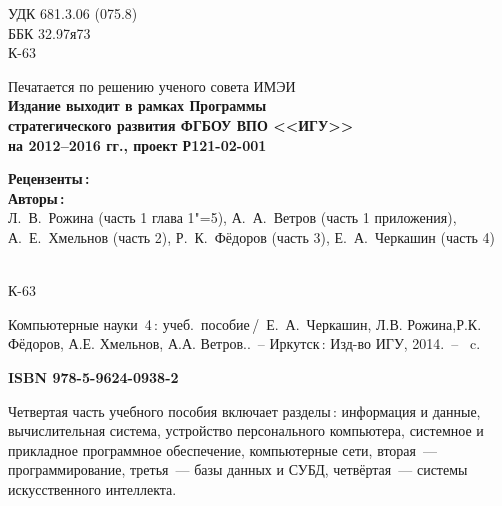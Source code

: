 \documentclass[a4paper,14pt, openany, twoside, draft]{extbook} %
\begin{document}
\newpage
\begin{mygroup}
\thispagestyle{empty}
\noindent УДК 681.3.06 (075.8)\\ %
\noindent ББК 32.97я73\\
\noindent\mbox{}\hspace{2em}К-63
\begin{center}\small
Печатается по решению ученого совета ИМЭИ\\[2ex]
\bfseries Издание выходит в рамках Программы\\
стратегического развития ФГБОУ ВПО <<ИГУ>>\\
на 2012--2016 гг., проект Р121-02-001
\end{center}
\vspace{0.5ex}
\begin{center}\small
  \textbf{Рецензенты\,:} \\
  \textbf{Авторы\,:}\\
  Л.~В.~Рожина (часть 1 глава 1"=5), А.~А.~Ветров (часть 1 приложения),\\
  А.~Е.~Хмельнов (часть 2), Р.~К.~Фёдоров (часть 3), Е.~А.~Черкашин (часть 4)
\end{center}
\vfill
\noindent\begin{minipage}[t]{2em}
\noindent\mbox{}\\
К-63
\end{minipage}%
\begin{minipage}[t]{0.95\linewidth}
\setlength{\parindent}{5ex}

Компьютерные науки~4\,{}: учеб.~пособие\,/~Е.~А.~Черкашин, Л.В. Рожина,Р.К. Фёдоров, А.Е. Хмельнов, А.А. Ветров..~-- Иркутск\,: Изд-во ИГУ, 2014.~-- \pageref{lastpage}~c.

{\bfseries ISBN 978-5-9624-0938-2}
\vspace{2ex}

\begingroup\footnotesize\parskip0pt
\vspace{1ex}


Четвертая часть учебного пособия включает разделы\,: информация и данные, вычислительная система, устройство персонального компьютера, системное и прикладное программное обеспечение, компьютерные сети, вторая~---  программирование, третья~--- базы данных и СУБД, четвёртая~--- системы искусственного интеллекта.


\end{minipage}
\end{mygroup}
\end{document}
